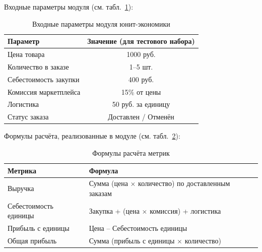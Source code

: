 Входные параметры модуля (см. табл.~\ref{tab:testUnitEcon}):
\begin{table}[htb]
\caption{\label{tab:testUnitEcon}Входные параметры модуля юнит-экономики}
\small
\begin{center}
\vspace{-0.5cm}\begin{tabular}{|l|c|}
\hline
Параметр & Значение (для тестового набора) \\ \hline
Цена товара & 1000 руб. \\ \hline
Количество в заказе & 1–5 шт. \\ \hline
Себестоимость закупки & 400 руб. \\ \hline
Комиссия маркетплейса & 15\% от цены \\ \hline
Логистика & 50 руб. за единицу \\ \hline
Статус заказа & Доставлен / Отменён \\ \hline
\end{tabular}
\end{center}
\end{table}

Формулы расчёта, реализованные в модуле (см. табл.~\ref{tab:equation}):
\begin{table}[htb]
\caption{\label{tab:equation}Формулы расчёта метрик}
\small
\begin{center}
\vspace{-0.5cm}\begin{tabular}{|l|l|}
\hline
Метрика & Формула \\ \hline
Выручка & Сумма (цена $\times$ количество) по доставленным заказам \\ \hline
Себестоимость единицы & Закупка + (цена $\times$ комиссия) + логистика \\ \hline
Прибыль с единицы & Цена – Себестоимость единицы \\ \hline
Общая прибыль & Сумма (прибыль с единицы $\times$ количество) \\ \hline
\end{tabular}
\end{center}
\end{table}

